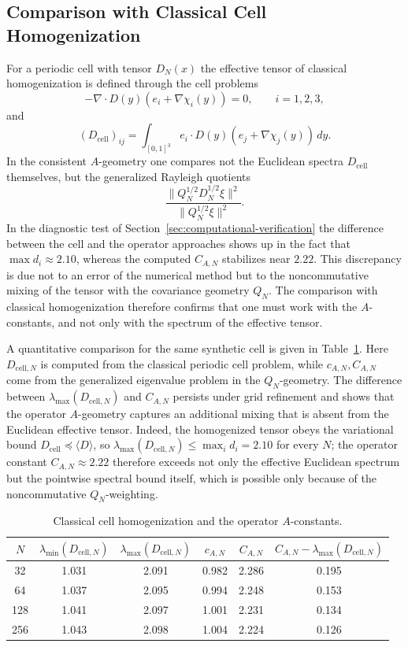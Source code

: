 \documentclass{article}
\begin{document}
\subsection{Comparison with Classical Cell Homogenization}
\label{subsec:cell-homogenization-comparison}
For a periodic cell with tensor \(D_N(x)\) the effective tensor of classical
homogenization is defined through the cell problems
\[
        -\nabla\cdot D(y)(e_i+\nabla\chi_i(y))=0,
        \qquad i=1,2,3,
\]
and
\[
        (D_{\mathrm{cell}})_{ij}
        =\int_{[0,1]^3} e_i\cdot D(y)(e_j+\nabla\chi_j(y))\,dy .
\]
In the consistent \(A\)-geometry one compares not the Euclidean spectra
\(D_{\mathrm{cell}}\) themselves, but the generalized Rayleigh quotients
\[
        \frac{\|Q_N^{1/2}D_N^{1/2}\xi\|^2}{\|Q_N^{1/2}\xi\|^2} .
\]
In the diagnostic test of Section~\ref{sec:computational-verification} the
difference between the cell and the operator approaches shows up in the fact that
\(\max d_i\approx2.10\), whereas the computed \(C_{A,N}\) stabilizes near
\(2.22\). This discrepancy is due not to an error of the numerical method but to
the noncommutative mixing of the tensor with the covariance geometry \(Q_N\). The
comparison with classical homogenization therefore confirms that one must work
with the \(A\)-constants, and not only with the spectrum of the effective tensor.

A quantitative comparison for the same synthetic cell is given in
Table~\ref{tab:cell-vs-A}. Here \(D_{\mathrm{cell},N}\) is computed from the
classical periodic cell problem, while \(c_{A,N},C_{A,N}\) come from the
generalized eigenvalue problem in the \(Q_N\)-geometry. The difference between
\(\lambda_{\max}(D_{\mathrm{cell},N})\) and \(C_{A,N}\) persists under grid
refinement and shows that the operator \(A\)-geometry captures an additional
mixing that is absent from the Euclidean effective tensor. Indeed, the
homogenized tensor obeys the variational bound
\(D_{\mathrm{cell}}\preceq\langle D\rangle\), so
\(\lambda_{\max}(D_{\mathrm{cell},N})\le\max_i d_i=2.10\) for every \(N\); the
operator constant \(C_{A,N}\approx2.22\) therefore exceeds not only the effective
Euclidean spectrum but the pointwise spectral bound itself, which is possible only
because of the noncommutative \(Q_N\)-weighting.

\begin{table}[h!]
\centering
\caption{Classical cell homogenization and the operator \(A\)-constants.}
\label{tab:cell-vs-A}
\begin{tabular}{|c|c|c|c|c|c|}
\hline
\(N\) &
\(\lambda_{\min}(D_{\mathrm{cell},N})\) &
\(\lambda_{\max}(D_{\mathrm{cell},N})\) &
\(c_{A,N}\) &
\(C_{A,N}\) &
\(C_{A,N}-\lambda_{\max}(D_{\mathrm{cell},N})\)\\
\hline
32  & 1.031 & 2.091 & 0.982 & 2.286 & 0.195\\
64  & 1.037 & 2.095 & 0.994 & 2.248 & 0.153\\
128 & 1.041 & 2.097 & 1.001 & 2.231 & 0.134\\
256 & 1.043 & 2.098 & 1.004 & 2.224 & 0.126\\
\hline
\end{tabular}
\end{table}
\end{document}

